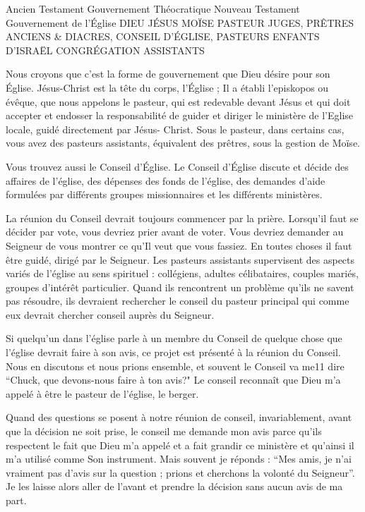 Ancien Testament
Gouvernement Théocratique
Nouveau Testament
Gouvernement de l’Église
DIEU JÉSUS
MOÏSE PASTEUR
JUGES, PRÊTRES ANCIENS \& DIACRES, CONSEIL D’ÉGLISE, PASTEURS
ENFANTS D’ISRAËL CONGRÉGATION
ASSISTANTS

Nous croyons que c’est la forme de gouvernement que Dieu désire pour son Église. Jésus-Christ est la tête du corps,
l’Église ; Il a établi l’episkopos ou évêque, que nous appelons le pasteur, qui est redevable devant Jésus et qui doit
accepter et endosser la responsabilité de guider et diriger le ministère de l’Eglise locale, guidé directement par Jésus-
Christ. Sous le pasteur, dans certains cas, vous avez des pasteurs assistants, équivalent des prêtres, sous la gestion
de Moïse.

Vous trouvez aussi le Conseil d’Église. Le Conseil d’Église discute et décide des affaires de l’église, des dépenses des
fonds de l’église, des demandes d’aide formulées par différents groupes missionnaires et les différents ministères.

La réunion du Conseil devrait toujours commencer par la prière. Lorsqu’il faut se décider par vote, vous devriez prier
avant de voter. Vous devriez demander au Seigneur de vous montrer ce qu’Il veut que vous fassiez. En toutes choses
il faut être guidé, dirigé par le Seigneur. Les pasteurs assistants supervisent des aspects variés de l’église au sens
spirituel : collégiens, adultes célibataires, couples mariés, groupes d’intérêt particulier. Quand ils rencontrent un
problème qu’ils ne savent pas résoudre, ils devraient rechercher le conseil du pasteur principal qui comme eux devrait
chercher conseil auprès du Seigneur.

Si quelqu’un dans l’église parle à un membre du Conseil de quelque chose que l’église devrait faire à son avis, ce
projet est présenté à la réunion du Conseil. Nous en discutons et nous prions ensemble, et souvent le Conseil va me11
dire “Chuck, que devons-nous faire à ton avis?" Le conseil reconnaît que Dieu m’a appelé à être le pasteur de
l’église, le berger.

Quand des questions se posent à notre réunion de conseil, invariablement, avant que la décision ne soit prise, le
conseil me demande mon avis parce qu’ils respectent le fait que Dieu m’a appelé et a fait grandir ce ministère et
qu'ainsi il m’a utilisé comme Son instrument. Mais souvent je réponds : “Mes amis, je n’ai vraiment pas d’avis sur la
question ; prions et cherchons la volonté du Seigneur”. Je les laisse alors aller de l’avant et prendre la décision sans
aucun avis de ma part.


